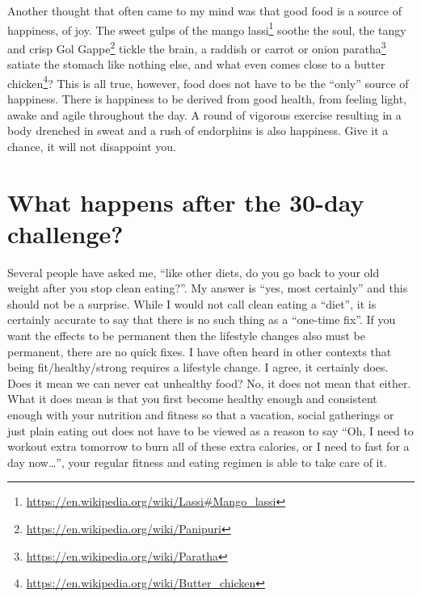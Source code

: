 \documentclass[
  oneside]{book}
\DeclareRobustCommand{\href}[2]{#2\footnote{\url{#1}}}
\begin{document}
Another thought that often came to my mind was that good food is a source of happiness, of joy. The sweet gulps of the \href{https://en.wikipedia.org/wiki/Lassi\#Mango_lassi}{mango lassi} soothe the soul, the tangy and crisp \href{https://en.wikipedia.org/wiki/Panipuri}{Gol Gappe} tickle the brain, a \href{https://en.wikipedia.org/wiki/Paratha}{raddish or carrot or onion paratha} satiate the stomach like nothing else, and what even comes close to a \href{https://en.wikipedia.org/wiki/Butter_chicken}{butter chicken}? This is all true, however, food does not have to be the ``only'' source of happiness. There is happiness to be derived from good health, from feeling light, awake and agile throughout the day. A round of vigorous exercise resulting in a body drenched in sweat and a rush of endorphins is also happiness. Give it a chance, it will not disappoint you.

\hypertarget{what-happens-after-the-30-day-challenge}{%
\section{What happens after the 30-day challenge?}\label{what-happens-after-the-30-day-challenge}}

Several people have asked me, ``like other diets, do you go back to your old weight after you stop clean eating?''. My answer is ``yes, most certainly'' and this should not be a surprise. While I would not call clean eating a ``diet'', it is certainly accurate to say that there is no such thing as a ``one-time fix''. If you want the effects to be permanent then the lifestyle changes also must be permanent, there are no quick fixes. I have often heard in other contexts that being fit/healthy/strong requires a lifestyle change. I agree, it certainly does. Does it mean we can never eat unhealthy food? No, it does not mean that either. What it does mean is that you first become healthy enough and consistent enough with your nutrition and fitness so that a vacation, social gatherings or just plain eating out does not have to be viewed as a reason to say ``Oh, I need to workout extra tomorrow to burn all of these extra calories, or I need to fast for a day now\ldots{}'', your regular fitness and eating regimen is able to take care of it.
\end{document}
